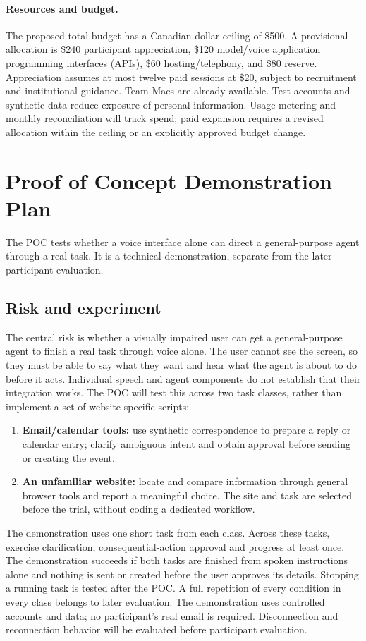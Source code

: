 \documentclass[11pt]{article}
\begin{document}
\paragraph{Resources and budget.}
The proposed total budget has a Canadian-dollar ceiling of \$500. A provisional
allocation is \$240 participant appreciation, \$120 model/voice application programming interfaces (APIs), \$60
hosting/telephony, and \$80 reserve. Appreciation assumes at most twelve paid
sessions at \$20, subject to recruitment and institutional guidance. Team Macs
are already available. Test accounts and synthetic data reduce exposure of
personal information. Usage metering and monthly reconciliation will track
spend; paid expansion requires a revised allocation within the ceiling or an
explicitly approved budget change.

\section{Proof of Concept Demonstration Plan}
The POC tests whether a voice interface alone can direct a general-purpose agent
through a real task. It is a technical demonstration, separate from the later
participant evaluation.
\subsection{Risk and experiment}
The central risk is whether a visually impaired user can get a general-purpose
agent to finish a real task through voice alone. The user cannot see the screen,
so they must be able to say what they want and hear what the agent is about to
do before it acts. Individual speech and agent components do not establish that
their integration works. The POC will test this across two task classes, rather
than implement a set of website-specific scripts:
\begin{enumerate}
\item \textbf{Email/calendar tools:} use synthetic correspondence to prepare a
reply or calendar entry; clarify ambiguous intent and obtain approval before
sending or creating the event.
\item \textbf{An unfamiliar website:} locate and compare information through
general browser tools and report a meaningful choice.
The site and task are selected before the trial, without coding a dedicated workflow.
\end{enumerate}

The demonstration uses one short task from each class. Across these tasks,
exercise clarification, consequential-action approval and progress at least
once. The demonstration succeeds if both tasks are finished from spoken
instructions alone and nothing is sent or created before the user approves its
details. Stopping a running task is tested after the POC. A full repetition of
every condition in every class belongs to later evaluation. The demonstration uses
controlled accounts and data; no participant's real email is required.
Disconnection and reconnection behavior will be evaluated before participant evaluation.
\end{document}
